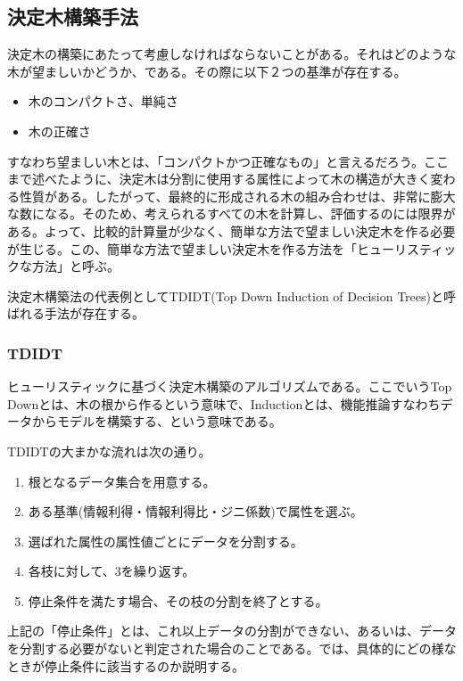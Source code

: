 \documentclass[dvipdfmx]{jsarticle}
\begin{document}
\subsection{決定木構築手法}
決定木の構築にあたって考慮しなければならないことがある。それはどのような木が望ましいかどうか、である。その際に以下２つの基準が存在する。
\begin{itemize}
  \item 木のコンパクトさ、単純さ
  \item 木の正確さ
\end{itemize}
すなわち望ましい木とは、「コンパクトかつ正確なもの」と言えるだろう。ここまで述べたように、決定木は分割に使用する属性によって木の構造が大きく変わる性質がある。したがって、最終的に形成される木の組み合わせは、非常に膨大な数になる。そのため、考えられるすべての木を計算し、評価するのには限界がある。よって、比較的計算量が少なく、簡単な方法で望ましい決定木を作る必要が生じる。この、簡単な方法で望ましい決定木を作る方法を「ヒューリスティックな方法」と呼ぶ。\par
決定木構築法の代表例としてTDIDT(Top Down Induction of Decision Trees)と呼ばれる手法が存在する。
\subsubsection{TDIDT}
ヒューリスティックに基づく決定木構築のアルゴリズムである。ここでいうTop Downとは、木の根から作るという意味で、Inductionとは、機能推論すなわちデータからモデルを構築する、という意味である。\par
TDIDTの大まかな流れは次の通り。
\begin{enumerate}
  \item 根となるデータ集合を用意する。
  \item ある基準(情報利得・情報利得比・ジニ係数)で属性を選ぶ。
  \item 選ばれた属性の属性値ごとにデータを分割する。
  \item 各枝に対して、3を繰り返す。
  \item 停止条件を満たす場合、その枝の分割を終了とする。
\end{enumerate}
上記の「停止条件」とは、これ以上データの分割ができない、あるいは、データを分割する必要がないと判定された場合のことである。では、具体的にどの様なときが停止条件に該当するのか説明する。
\end{document}
